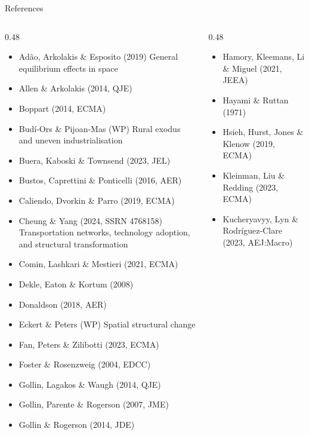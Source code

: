 \documentclass[10pt,aspectratio=169]{beamer}
\begin{document}
\begin{frame}{References}
  \begin{columns}[T]
    \begin{column}{0.48\textwidth}
    \scriptsize
    \begin{itemize}\setlength{\itemsep}{0pt}
      \item Adão, Arkolakis \& Esposito (2019) General equilibrium effects in space
      \item Allen \& Arkolakis (2014, QJE)
      \item Boppart (2014, ECMA)
      \item Budí-Ors \& Pijoan-Mas (WP) Rural exodus and uneven industrialisation
      \item Buera, Kaboski \& Townsend (2023, JEL)
      \item Bustos, Caprettini \& Ponticelli (2016, AER)
      \item Caliendo, Dvorkin \& Parro (2019, ECMA)
      \item Cheung \& Yang (2024, SSRN 4768158) Transportation networks, technology adoption, and structural transformation
      \item Comin, Lashkari \& Mestieri (2021, ECMA)
      \item Dekle, Eaton \& Kortum (2008)
      \item Donaldson (2018, AER)
      \item Eckert \& Peters (WP) Spatial structural change
      \item Fan, Peters \& Zilibotti (2023, ECMA)
      \item Foster \& Rosenzweig (2004, EDCC)
      \item Gollin, Lagakos \& Waugh (2014, QJE)
      \item Gollin, Parente \& Rogerson (2007, JME)
      \item Gollin \& Rogerson (2014, JDE)
    \end{itemize}
    \end{column}
    \begin{column}{0.48\textwidth}
    \scriptsize
    \begin{itemize}\setlength{\itemsep}{0pt}
      \item Hamory, Kleemans, Li \& Miguel (2021, JEEA)
      \item Hayami \& Ruttan (1971)
      \item Hsieh, Hurst, Jones \& Klenow (2019, ECMA)
      \item Kleinman, Liu \& Redding (2023, ECMA)
      \item Kucheryavyy, Lyn \& Rodríguez-Clare (2023, AEJ:Macro)

\end{itemize}
\end{column}
\end{columns}
\end{frame}
\end{document}
